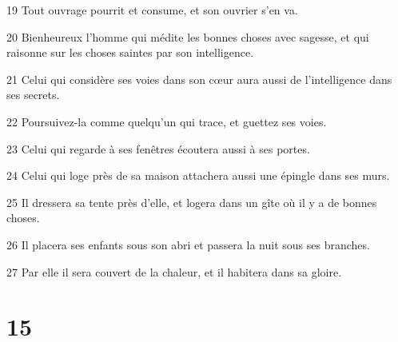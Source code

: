 \par 19 Tout ouvrage pourrit et consume, et son ouvrier s'en va.
\par 20 Bienheureux l'homme qui médite les bonnes choses avec sagesse, et qui raisonne sur les choses saintes par son intelligence.
\par 21 Celui qui considère ses voies dans son cœur aura aussi de l'intelligence dans ses secrets.
\par 22 Poursuivez-la comme quelqu'un qui trace, et guettez ses voies.
\par 23 Celui qui regarde à ses fenêtres écoutera aussi à ses portes.
\par 24 Celui qui loge près de sa maison attachera aussi une épingle dans ses murs.
\par 25 Il dressera sa tente près d'elle, et logera dans un gîte où il y a de bonnes choses.
\par 26 Il placera ses enfants sous son abri et passera la nuit sous ses branches.
\par 27 Par elle il sera couvert de la chaleur, et il habitera dans sa gloire.

\chapter{15}

